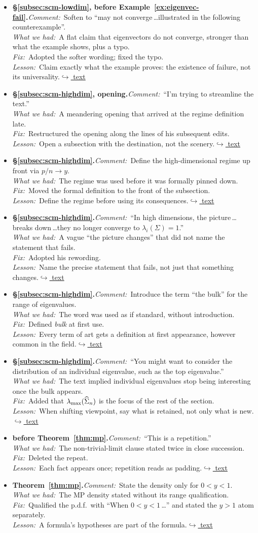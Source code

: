 \documentclass[12pt]{article}
\newcommand{\gdlogentry}[6]{%
  \item[\textcolor{thesisRev}{$\star$\,\ref{gdrev:#1}}]\hypertarget{gdlog:#1}{}%
  \textbf{#2.}\enspace\emph{Comment:}~#3\\
  \emph{What we had:}~#4\\
  \emph{Fix:}~#5\\
  \emph{Lesson:}~#6\enspace\hyperlink{gdtext:#1}{\textcolor{thesisLink}{$\hookrightarrow$ text}}}
\begin{document}
\begin{itemize}[leftmargin=2.4em,itemsep=0.55em]
\gdlogentry{eigvec-mayfail}{\S\ref{subsec:scm-lowdim}, before Example~\ref{ex:eigenvec-fail}}{Soften to ``may not converge\,\dots illustrated in the following counterexample''.}{A flat claim that eigenvectors do not converge, stronger than what the example shows, plus a typo.}{Adopted the softer wording; fixed the typo.}{Claim exactly what the example proves: the existence of failure, not its universality.}

\gdlogentry{streamline}{\S\ref{subsec:scm-highdim}, opening}{``I'm trying to streamline the text.''}{A meandering opening that arrived at the regime definition late.}{Restructured the opening along the lines of his subsequent edits.}{Open a subsection with the destination, not the scenery.}

\gdlogentry{hdr-def}{\S\ref{subsec:scm-highdim}}{Define the high-dimensional regime up front via \(p/n \to y\).}{The regime was used before it was formally pinned down.}{Moved the formal definition to the front of the subsection.}{Define the regime before using its consequences.}

\gdlogentry{breakdown}{\S\ref{subsec:scm-highdim}}{``In high dimensions, the picture\,\dots breaks down\,\dots they no longer converge to \(\lambda_i(\Sigma)=1\).''}{A vague ``the picture changes'' that did not name the statement that fails.}{Adopted his rewording.}{Name the precise statement that fails, not just that something changes.}

\gdlogentry{bulk}{\S\ref{subsec:scm-highdim}}{Introduce the term ``the bulk'' for the range of eigenvalues.}{The word was used as if standard, without introduction.}{Defined \emph{bulk} at first use.}{Every term of art gets a definition at first appearance, however common in the field.}

\gdlogentry{individual-eig}{\S\ref{subsec:scm-highdim}}{``You might want to consider the distribution of an individual eigenvalue, such as the top eigenvalue.''}{The text implied individual eigenvalues stop being interesting once the bulk appears.}{Added that \(\lambda_{\max}(\widehat{\Sigma}_n)\) is the focus of the rest of the section.}{When shifting viewpoint, say what is retained, not only what is new.}

\gdlogentry{mp-repeat}{before Theorem~\ref{thm:mp}}{``This is a repetition.''}{The non-trivial-limit clause stated twice in close succession.}{Deleted the repeat.}{Each fact appears once; repetition reads as padding.}

\gdlogentry{mp-pdf-range}{Theorem~\ref{thm:mp}}{State the density only for \(0 < y < 1\).}{The MP density stated without its range qualification.}{Qualified the p.d.f.\ with ``When \(0 < y < 1\)\,\dots'' and stated the \(y > 1\) atom separately.}{A formula's hypotheses are part of the formula.}


\end{itemize}
\end{document}

